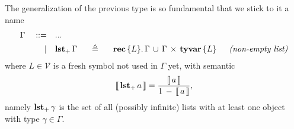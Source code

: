 \begin{definition}
The generalization of the previous type is so fundamental that we stick to it a name
\begin{displaymath}
\begin{split}
    \Gamma\quad::=\quad&... \\
           |\quad&\tydef{\tynnlst{\Gamma}}{\tyrec{ \lbrace L \rbrace}{\tydu{\Gamma}{\tycp{\Gamma}{\tyvar{ \lbrace L \rbrace}}}}}{non-empty list}
\end{split}
\end{displaymath}
where $L\in\mathcal{V}$ is a fresh symbol not used in $\Gamma$ yet, with semantic
\begin{displaymath}
    \left\llbracket\,\textbf{lst}_{+}\,a\,\right\rrbracket = \frac{\left\llbracket\,a\,\right\rrbracket}{1\,-\,\left\llbracket\,a\,\right\rrbracket},
\end{displaymath}
namely $\textbf{lst}_{+}\,\gamma$ is the set of all (possibly infinite) lists with at least 
one object with type $\gamma\in\Gamma$. 
\end{definition}

